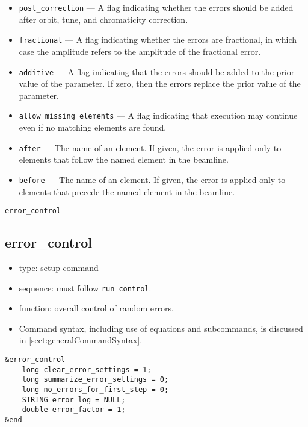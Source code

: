 \documentclass[11pt]{article}
\begin{document}
\begin{itemize}
\item \verb|post_correction| --- A flag indicating whether the errors should be added after orbit, tune, and chromaticity correction.
\item \verb|fractional| --- A flag indicating whether the errors are fractional, in which case the amplitude refers to
the amplitude of the fractional error.
\item \verb|additive| --- A flag indicating that the errors should be added to the prior value of the
parameter.  If zero, then the errors replace the prior value of the parameter.
\item \verb|allow_missing_elements| --- A flag indicating that execution may continue even if no matching elements are found.
\item \verb|after| --- The name of an element.  If given, the error is applied only to elements
 that follow the named element in the beamline.
\item \verb|before| --- The name of an element.  If given, the error is applied only to elements
 that precede the named element in the beamline.
\end{itemize}

\newpage
\begin{center}{\Large\verb|error_control|}\end{center}
\subsection{error\_control \label{subsec:errorcontrol}}

\begin{itemize}
\item type: setup command
\item sequence: must follow \verb|run_control|.
\item function: overall control of random errors.
\item Command syntax, including use of equations and subcommands, is discussed in \ref{sect:generalCommandSyntax}.
\end{itemize}

\begin{verbatim}
&error_control
    long clear_error_settings = 1;
    long summarize_error_settings = 0;
    long no_errors_for_first_step = 0;
    STRING error_log = NULL;
    double error_factor = 1;
&end
\end{verbatim}
\end{document}
